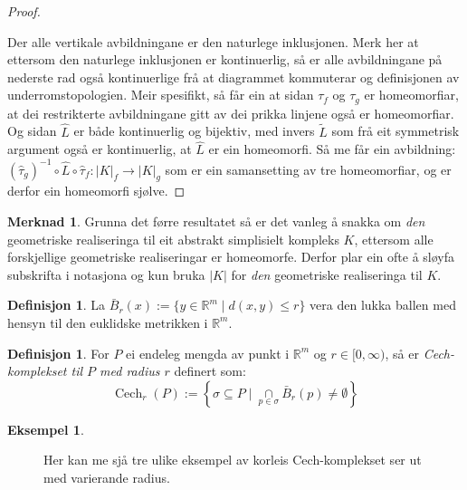 \documentclass[a4paper, titlepage, 12pt, norsk]{article}
\theoremstyle{plain}
\theoremstyle{definition}
\newtheorem{definition}[theorem]{Definisjon}
\newtheorem{example}[theorem]{Eksempel}
\newtheorem{remark}[theorem]{Merknad}
\newcommand{\Rb}{\mathbb{R}}
\DeclareMathOperator{\Cech}{Cech}
\newcommand{\intersect}{ \mathop{\cap}\limits } %
\newcommand{\gr}[1]{ \lvert #1 \rvert } %
\begin{document}
\begin{theroem}
\begin{proof}
\begin{center}
	\end{center}
	Der alle vertikale avbildningane er den naturlege inklusjonen.
	Merk her at ettersom den naturlege inklusjonen er kontinuerlig, så er alle avbildningane på nederste rad også kontinuerlige frå at diagrammet kommuterar og definisjonen av underromstopologien. Meir spesifikt, så får ein at sidan $\tau_f$ og $\tau_g$ er homeomorfiar, at dei restrikterte avbildningane gitt av dei prikka linjene også er homeomorfiar.
	Og sidan $\hat{L}$ er både kontinuerlig og bijektiv, med invers $\tilde{L}$ som frå eit symmetrisk argument også er kontinuerlig, at $\hat{L}$ er ein homeomorfi.
	Så me får ein avbildning: $(\hat{\tau}_g)^{-1}\circ\hat{L}\circ\hat{\tau}_f:\gr{K}_f\to\gr{K}_g$ som er ein samansetting av tre homeomorfiar, og er derfor ein homeomorfi sjølve.
\end{proof}

\begin{remark}
	Grunna det førre resultatet så er det vanleg å snakka om \emph{den} geometriske realiseringa til eit abstrakt simplisielt kompleks $K$, ettersom alle forskjellige geometriske realiseringar er homeomorfe. Derfor plar ein ofte å sløyfa subskrifta i notasjona og kun bruka $\gr{K}$ for \emph{den} geometriske realiseringa til $K$.
\end{remark}

\begin{definition}
	La $\bar{B}_r(x):=\{y\in\Rb^m \mid d(x, y)\leq r\}$ vera den lukka ballen med hensyn til den euklidske metrikken i $\Rb^m$.
\end{definition}

\begin{definition}
	For $P$ ei endeleg mengda av punkt i $\Rb^m$ og $r\in[0,\infty)$, så er \emph{Cech-komplekset til $P$ med radius $r$} definert som:
	\[
		\Cech_r(P):=\left\{\sigma\subseteq P \mid \intersect_{p\in\sigma}\bar{B}_r(p)\neq\emptyset\right\}
	\]
\end{definition}

\begin{example}
	\phantom{abcd}
	\begin{figure}[htbp]
		\begin{center}
			
		\end{center}
		\caption{Her kan me sjå tre ulike eksempel av korleis Cech-komplekset ser ut med varierande radius.}
	\end{figure}
\end{example}


\end{theroem}
\end{document}
